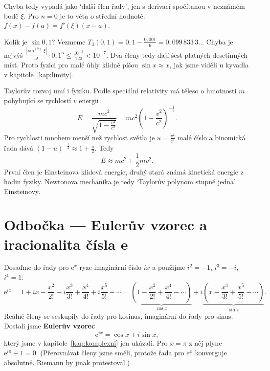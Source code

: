 Chyba tedy vypadá jako `další člen řady', jen s derivací spočítanou v neznámém bodě $\xi$. Pro $n = 0$ je to věta o střední hodnotě: $f(x) - f(a) = f'(\xi)(x - a)$.

\begin{example}
  Kolik je $\sin 0{,}1$? Vezmeme $T_3(0{,}1) = 0{,}1 - \frac{0{,}001}{6} = 0{,}099\,833\,3\ldots$ Chyba je nejvýš $\frac{|\sin^{(5)}\xi|}{5!}\cdot 0{,}1^5\leq\frac{10^{-5}}{120} < 10^{-7}$. Dva členy tedy dají šest platných desetinných míst. Proto fyzici pro malé úhly klidně píšou $\sin x\approx x$, jak jsme viděli u kyvadla v kapitole~\ref{kap:limity}.
\end{example}

\begin{example}
  Taylorův rozvoj umí i fyziku. Podle speciální relativity má těleso o hmotnosti $m$ pohybující se rychlostí $v$ energii
  \begin{equation*}
    E = \frac{mc^2}{\sqrt{1 - \frac{v^2}{c^2}}} = mc^2{\left(1 - \frac{v^2}{c^2}\right)}^{-\frac{1}{2}}.
  \end{equation*}
  Pro rychlosti mnohem menší než rychlost světla je $u = \frac{v^2}{c^2}$ malé číslo a binomická řada dává ${(1 - u)}^{-\frac{1}{2}}\approx 1 + \frac{u}{2}$. Tedy
  \begin{equation*}
    E\approx mc^2 + \frac{1}{2}mv^2.
  \end{equation*}
  První člen je Einsteinova klidová energie, druhý stará známá kinetická energie z hodin fyziky. Newtonova mechanika je tedy `Taylorův polynom stupně jedna' Einsteinovy.
\end{example}

\section{Odbočka --- Eulerův vzorec a iracionalita čísla e}

Dosaďme do řady pro $\mathrm{e}^x$ ryze imaginární číslo $ix$ a použijme $i^2 = -1$, $i^3 = -i$, $i^4 = 1$:
\begin{equation*}
  \mathrm{e}^{ix} = 1 + ix - \frac{x^2}{2!} - i\frac{x^3}{3!} + \frac{x^4}{4!} + i\frac{x^5}{5!} - \cdots = \underbrace{\left(1 - \frac{x^2}{2!} + \frac{x^4}{4!} - \cdots\right)}_{\cos x} + i\underbrace{\left(x - \frac{x^3}{3!} + \frac{x^5}{5!} - \cdots\right)}_{\sin x}.
\end{equation*}
Reálné členy se seskupily do řady pro kosinus, imaginární do řady pro sinus. Dostali jsme \textbf{Eulerův vzorec}
\begin{equation*}
  \mathrm{e}^{ix} = \cos x + i\sin x,
\end{equation*}
který jsme v kapitole~\ref{kap:komplexni} jen ukázali. Pro $x = \pi$ z něj plyne $\mathrm{e}^{i\pi} + 1 = 0$. (Přerovnávat členy jsme směli, protože řada pro $\mathrm{e}^x$ konverguje absolutně. Riemann by jinak protestoval.)

